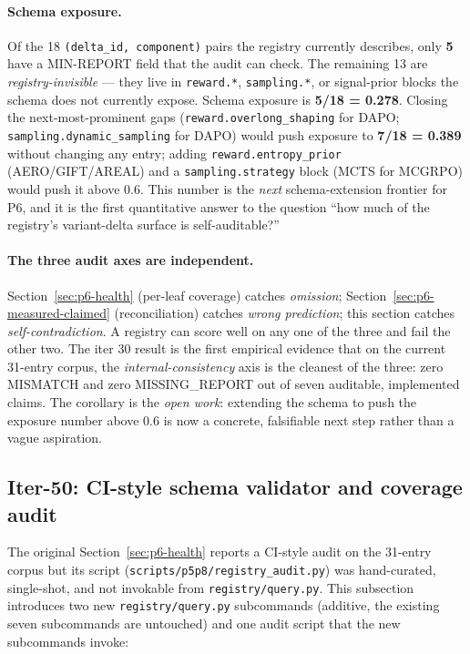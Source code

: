 \documentclass{article}
\providecommand{\secref}[1]{Section~\ref{#1}}
\begin{document}
\paragraph{Schema exposure.} Of the 18
\texttt{(delta\_id, component)} pairs the registry currently
describes, only \textbf{5} have a MIN-REPORT field that the audit
can check. The remaining 13 are \emph{registry-invisible} --- they
live in \texttt{reward.*}, \texttt{sampling.*}, or signal-prior
blocks the schema does not currently expose. Schema exposure is
\textbf{5/18 = 0.278}. Closing the next-most-prominent gaps
(\texttt{reward.overlong\_shaping} for DAPO;
\texttt{sampling.dynamic\_sampling} for DAPO) would push exposure to
\textbf{7/18 = 0.389} without changing any entry; adding
\texttt{reward.entropy\_prior} (AERO/GIFT/AREAL) and a
\texttt{sampling.strategy} block (MCTS for MCGRPO) would push it
above 0.6. This number is the \emph{next} schema-extension
frontier for P6, and it is the first quantitative answer to the
question ``how much of the registry's variant-delta surface is
self-auditable?''

\paragraph{The three audit axes are independent.}
\secref{sec:p6-health} (per-leaf coverage) catches \emph{omission};
\secref{sec:p6-measured-claimed} (reconciliation) catches
\emph{wrong prediction}; this section catches \emph{self-contradiction}.
A registry can score well on any one of the three and fail the
other two. The iter 30 result is the first empirical evidence that
on the current 31-entry corpus, the \emph{internal-consistency} axis
is the cleanest of the three: zero MISMATCH and zero MISSING\_REPORT
out of seven auditable, implemented claims. The corollary is the
\emph{open work}: extending the schema to push the exposure number
above 0.6 is now a concrete, falsifiable next step rather than a
vague aspiration.
\subsection{Iter-50: CI-style schema validator and coverage audit}
\label{sec:p6-registry-health-iter50}

The original \secref{sec:p6-health} reports a CI-style audit on the
31-entry corpus but its script (\texttt{scripts/p5p8/registry\_audit.py})
was hand-curated, single-shot, and not invokable from
\texttt{registry/query.py}. This subsection introduces two new
\texttt{registry/query.py} subcommands (additive, the existing seven
subcommands are untouched) and one audit script that the new
subcommands invoke:
\end{document}

